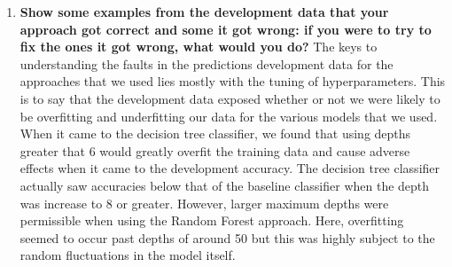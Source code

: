 \documentclass[5px]{report}
\begin{document}
\begin{enumerate}
\item \textbf{Show some examples from the development data that your approach got correct and some it got wrong: if you were to try to fix the ones it got wrong, what would you do?}
The keys to understanding the faults in the predictions development data for the approaches that we used lies mostly with the tuning of hyperparameters.  This is to say that the development data exposed whether or not we were likely to be overfitting and underfitting our data for the various models that we used.  When it came to the decision tree classifier, we found that using depths greater that 6 would greatly overfit the training data and cause adverse effects when it came to the development accuracy.   The decision tree classifier actually saw accuracies below that of the baseline classifier when the depth was increase to 8 or greater.  However, larger maximum depths were permissible when using the Random Forest approach.  Here, overfitting seemed to occur past depths of around 50 but this was highly subject to the random fluctuations in the model itself.
\end{enumerate}
\end{document}
